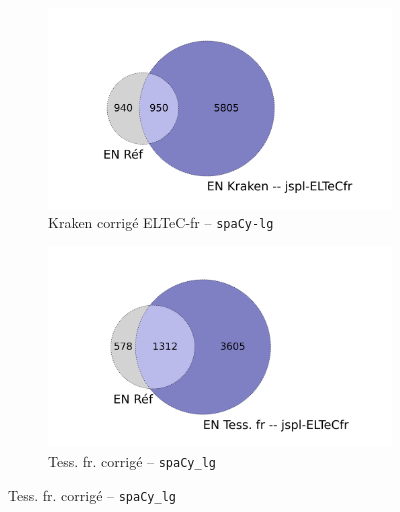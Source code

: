 \begin{figure}[h!]
\begin{minipage}{7cm}
\begin{subfigure}{1\textwidth}
 \label{fig:ELTeCFRA_Tess -- spacy-lg-concat_intersection}
  \end{subfigure}
    \end{minipage}
\begin{minipage}{7cm}
  \begin{subfigure}{1\textwidth}
  \includegraphics[width=1\textwidth]{IMAGES/INTERSECTIONS_GLOBALES/ELTeCFRA_Kraken -- jspl-ELTeCfr_spacy-lg-concat_intersection.png} 
  \caption{Kraken corrigé ELTeC-fr -- \texttt{spaCy-lg}}
  \label{fig:ELTeCFRA_Kraken -- jspl-ELTeCfr_spacy-lg-concat_intersection}
  \end{subfigure}
  \end{minipage}
  \begin{minipage}{7cm}
  \begin{subfigure}{1\textwidth}
  \includegraphics[width=1\textwidth]{IMAGES/INTERSECTIONS_GLOBALES/ELTeCFRA_Tess. fr -- jspl-ELTeCfr_spacy-lg-concat_intersection.png} %
  \caption{Tess. fr. corrigé -- \texttt{spaCy\_lg}}

\end{subfigure}
\end{minipage}
\end{figure}
